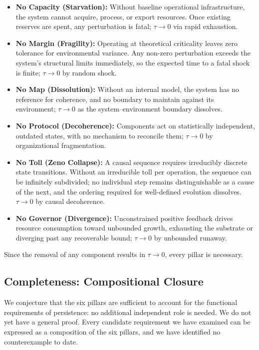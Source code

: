 \begin{itemize}
    \item \textbf{No Capacity (Starvation):} Without baseline operational infrastructure, the system cannot acquire, process, or export resources. Once existing reserves are spent, any perturbation is fatal; $\tau \to 0$ via rapid exhaustion.

    \item \textbf{No Margin (Fragility):} Operating at theoretical criticality leaves zero tolerance for environmental variance. Any non-zero perturbation exceeds the system's structural limits immediately, so the expected time to a fatal shock is finite; $\tau \to 0$ by random shock.

   \item \textbf{No Map (Dissolution):} Without an internal model, the system has no reference for coherence, and no boundary to maintain against its environment; $\tau \to 0$ as the system--environment boundary dissolves. 

    \item \textbf{No Protocol (Decoherence):} Components act on statistically independent, outdated states, with no mechanism to reconcile them; $\tau \to 0$ by organizational fragmentation.

    \item \textbf{No Toll (Zeno Collapse):} A causal sequence requires irreducibly discrete state transitions. Without an irreducible toll per operation, the sequence can be infinitely subdivided; no individual step remains distinguishable as a cause of the next, and the ordering required for well-defined evolution dissolves. $\tau \to 0$ by causal decoherence.
    
    \item \textbf{No Governor (Divergence):} Unconstrained positive feedback drives resource consumption toward unbounded growth, exhausting the substrate or diverging past any recoverable bound; $\tau \to 0$ by unbounded runaway.
\end{itemize}
    
Since the removal of any component results in $\tau \to 0$, every pillar is necessary.


\subsection{Completeness: Compositional Closure}
\label{subsec:pillars_sufficiency}
We conjecture that the six pillars are sufficient to account for the functional requirements of persistence: no additional independent role is needed. We do not yet have a general proof. Every candidate requirement we have examined can be expressed as a composition of the six pillars, and we have identified no counterexample to date.

